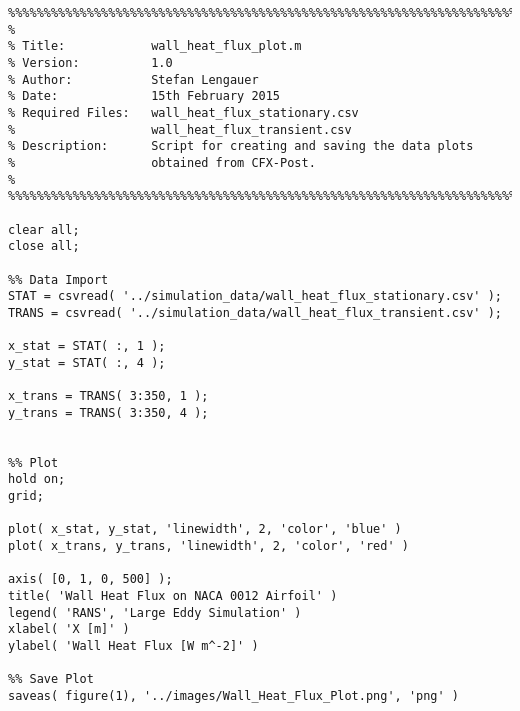 \begin{lstlisting}
%%%%%%%%%%%%%%%%%%%%%%%%%%%%%%%%%%%%%%%%%%%%%%%%%%%%%%%%%%%%%%%%%%%%%%%%%%%
%
% Title:            wall_heat_flux_plot.m
% Version:          1.0
% Author:           Stefan Lengauer
% Date:             15th February 2015
% Required Files:   wall_heat_flux_stationary.csv
%                   wall_heat_flux_transient.csv
% Description:      Script for creating and saving the data plots
%                   obtained from CFX-Post.
%
%%%%%%%%%%%%%%%%%%%%%%%%%%%%%%%%%%%%%%%%%%%%%%%%%%%%%%%%%%%%%%%%%%%%%%%%%%%

clear all;
close all;

%% Data Import
STAT = csvread( '../simulation_data/wall_heat_flux_stationary.csv' );
TRANS = csvread( '../simulation_data/wall_heat_flux_transient.csv' );

x_stat = STAT( :, 1 );
y_stat = STAT( :, 4 );

x_trans = TRANS( 3:350, 1 );
y_trans = TRANS( 3:350, 4 );


%% Plot
hold on;
grid;

plot( x_stat, y_stat, 'linewidth', 2, 'color', 'blue' )
plot( x_trans, y_trans, 'linewidth', 2, 'color', 'red' )

axis( [0, 1, 0, 500] );
title( 'Wall Heat Flux on NACA 0012 Airfoil' )
legend( 'RANS', 'Large Eddy Simulation' )
xlabel( 'X [m]' )
ylabel( 'Wall Heat Flux [W m^-2]' )

%% Save Plot
saveas( figure(1), '../images/Wall_Heat_Flux_Plot.png', 'png' )
\end{lstlisting}